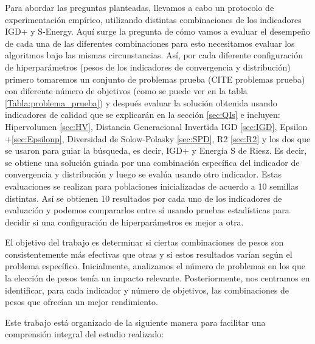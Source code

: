 Para abordar las preguntas planteadas, llevamos a cabo un protocolo de experimentación empírico, utilizando distintas combinaciones de los indicadores IGD+ y S-Energy. Aquí surge la pregunta de cómo vamos a evaluar el desempeño de cada una de las diferentes combinaciones para esto necesitamos evaluar los algoritmos bajo las mismas circunstancias. Así, por cada diferente configuración de hiperparámetros (pesos de los indicadores de convergencia y distribución) primero tomaremos un conjunto de problemas prueba (CITE problemas prueba) con diferente número de objetivos (como se puede ver en la tabla \ref{Tabla:problema_prueba}) y después evaluar la solución obtenida usando indicadores de calidad que se explicarán en la sección \ref{sec:QIs} e incluyen: Hipervolumen \ref{sec:HV}, Distancia Generacional Invertida IGD \ref{sec:IGD}, Epsilon +\ref{sec:Epsilonp}, Diversidad de Solow-Polasky \ref{sec:SPD}, R2 \ref{sec:R2} y los dos que se usaron para guiar la búsqueda, es decir, IGD+ y Energía S de Riesz. Es decir, se obtiene una solución guiada por una combinación específica del indicador de convergencia y distribución y luego se evalúa usando otro indicador. Estas evaluaciones se realizan para poblaciones inicializadas de acuerdo a 10 semillas distintas. Así se obtienen 10 resultados por cada uno de los indicadores de evaluación y podemos compararlos entre sí usando pruebas estadísticas para decidir si una configuración de hiperparámetros es mejor a otra.

El objetivo del trabajo es determinar si ciertas combinaciones de pesos son consistentemente más efectivas que otras y si estos resultados varían según el problema específico. Inicialmente, analizamos el número de problemas en los que la elección de pesos tenía un impacto relevante. Posteriormente, nos centramos en identificar, para cada indicador y número de objetivos, las combinaciones de pesos que ofrecían un mejor rendimiento.

Este trabajo está organizado de la siguiente manera para facilitar una comprensión integral del estudio realizado:

